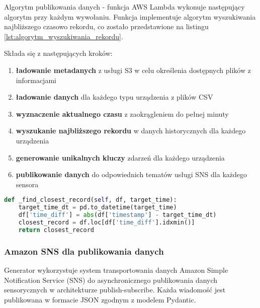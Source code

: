 Algorytm publikowania danych - funkcja AWS Lambda wykonuje następujący algorytm przy każdym wywołaniu. Funkcja implementuje algorytm wyszukiwania najbliższego czasowo rekordu, co zostało przedstawione na listingu \ref{lst:algorytm_wyszukiwania_rekordu}. 

\vspace{0.3em}

Składa się z następujących kroków:

\begin{enumerate}
    \item \textbf{ładowanie metadanych} z usługi S3 w celu określenia dostępnych plików z informacjami
    \item \textbf{ładowanie danych} dla każdego typu urządzenia z plików CSV
    \item \textbf{wyznaczenie aktualnego czasu} z zaokrągleniem do pełnej minuty
    \item \textbf{wyszukanie najbliższego rekordu} w danych historycznych dla każdego urządzenia
    \item \textbf{generowanie unikalnych kluczy} zdarzeń dla każdego urządzenia
    \item \textbf{publikowanie danych} do odpowiednich tematów usługi SNS dla każdego sensora
\end{enumerate}

\vspace{0.3em}

\begin{lstlisting}[language=Python, caption=Algorytm wyszukiwania najbliższego rekordu, label={lst:algorytm_wyszukiwania_rekordu}]
def _find_closest_record(self, df, target_time):
    target_time_dt = pd.to_datetime(target_time)
    df['time_diff'] = abs(df['timestamp'] - target_time_dt)
    closest_record = df.loc[df['time_diff'].idxmin()]
    return closest_record
\end{lstlisting}

\subsubsection{Amazon SNS dla publikowania danych}
\label{subsec:amazon_sns}

Generator wykorzystuje system transportowania danych Amazon Simple Notification Service (SNS) do asynchronicznego publikowania danych sensorycznych w architekturze publish-subscribe. Każda wiadomość jest publikowana w formacie JSON zgodnym z modelem Pydantic.

\vspace{0.3em}

